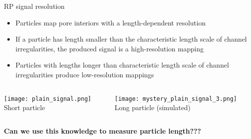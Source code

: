\begin{frame}[c]{RP signal resolution}
	
	\vspace{-.1in}
	\begin{itemize}
		\item Particles map pore interiors with a length-dependent resolution
		\item If a particle has length smaller than the characteristic length scale of channel irregularities, the produced signal is a high-resolution mapping
		\item Particles with lengths longer than characteristic length scale of channel irregularities produce low-resolution mappings
	\end{itemize}
	
	
	
	\begin{columns}[t]
		
	
		\begin{column}[T]{2.25in}
			{\centering
				\texttt{[image: plain\_signal.png]} \\
				Short particle \\
			}
		\end{column}
		  
		\begin{column}[T]{2.25in}
			{\centering
				\texttt{[image: mystery\_plain\_signal\_3.png]} \\
				Long particle (simulated) \\
			}
		\end{column}

	\end{columns}
	\vspace{.2in}
	\textcolor{negativered}{\textbf{Can we use this knowledge to measure particle length???}}


	
	
	
	

\end{frame}



